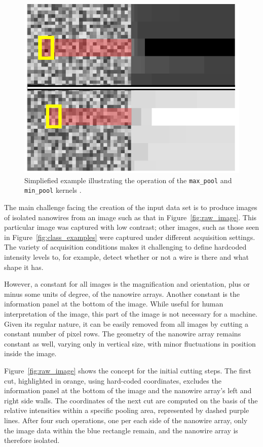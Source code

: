 \begin{figure}
    \centering
    \includegraphics{5_Yield_Analysis/Fig/min_max_pool.pdf}
    \caption[Simpliefied example illustrating the operation of the \texttt{max\_pool} and \texttt{min\_pool} kernels.]{Simpliefied example illustrating the operation of the \texttt{max\_pool} and \texttt{min\_pool} kernels \cite{Brugnolotto2024}.}
    \label{fig:min_max_pool}
\end{figure}

The main challenge facing the creation of the input data set is to produce images of isolated nanowires from an image such as that in Figure~\ref{fig:raw_image}. This particular image was captured with low contrast; other images, such as those seen in Figure~\ref{fig:class_examples} were captured under different acquisition settings. The variety of acquisition conditions makes it challenging to define hardcoded intensity levels to, for example, detect whether or not a wire is there and what shape it has.

However, a constant for all images is the magnification and orientation, plus or minus some units of degree, of the nanowire arrays. Another constant is the information panel at the bottom of the image. While useful for human interpretation of the image, this part of the image is not necessary for a machine. Given its regular nature, it can be easily removed from all images by cutting a constant number of pixel rows. The geometry of the nanowire array remains constant as well, varying only in vertical size, with minor fluctuations in position inside the image.

Figure~\ref{fig:raw_image} shows the concept for the initial cutting steps. The first cut, highlighted in orange, using hard-coded coordinates, excludes the information panel at the bottom of the image and the nanowire array's left and right side walls. The coordinates of the next cut are computed on the basis of the relative intensities within a specific pooling area, represented by dashed purple lines. After four such operations, one per each side of the nanowire array, only the image data within the blue rectangle remain, and the nanowire array is therefore isolated.

